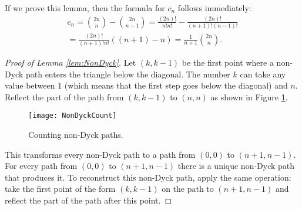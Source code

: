 \begin{page}


If we prove this lemma, then the formula for $c_n$ follows immediately:
\begin{multline*}
c_n = \binom{2n}{n} - \binom{2n}{n-1} = \frac{(2n)!}{n!n!} - \frac{(2n)!}{(n+1)!(n-1)!}\\
= \frac{(2n)!}{(n+1)!n!}((n+1) - n) = \frac{1}{n+1} \binom{2n}{n}.
\end{multline*}


\begin{proof}[Proof of Lemma \ref{lem:NonDyck}]
Let $(k,k-1)$ be the first point where a non-Dyck path enters the triangle below the diagonal.
The number $k$ can take any value between $1$ (which means that the first step goes below the diagonal) and $n$.
Reflect the part of the path from $(k,k-1)$ to $(n,n)$ as shown in Figure \ref{fig:NonDyckCount}.

\begin{figure}[ht]
\begin{center}
\texttt{[image: NonDyckCount]}
\end{center}
\caption{Counting non-Dyck paths.}
\label{fig:NonDyckCount}
\end{figure}

This transforms every non-Dyck path to a path from $(0,0)$ to $(n+1,n-1)$.
For every path from $(0,0)$ to $(n+1,n-1)$ there is a unique non-Dyck path that produces it.
To reconstruct this non-Dyck path, apply the same operation: take the first point of the form $(k,k-1)$ on the path to $(n+1,n-1)$
and reflect the part of the path after this point.
\end{proof}




\end{page}


